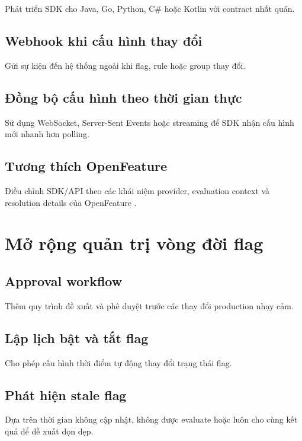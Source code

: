 Phát triển SDK cho Java, Go, Python, C\# hoặc Kotlin với contract nhất quán.

\subsection{Webhook khi cấu hình thay đổi}

Gửi sự kiện đến hệ thống ngoài khi flag, rule hoặc group thay đổi.

\subsection{Đồng bộ cấu hình theo thời gian thực}

Sử dụng WebSocket, Server-Sent Events hoặc streaming để SDK nhận cấu hình mới nhanh hơn polling.

\subsection{Tương thích OpenFeature}

Điều chỉnh SDK/API theo các khái niệm provider, evaluation context và resolution details của OpenFeature \cite{openfeature_evaluation_context,openfeature_flag_evaluation}.

\section{Mở rộng quản trị vòng đời flag}

\subsection{Approval workflow}

Thêm quy trình đề xuất và phê duyệt trước các thay đổi production nhạy cảm.

\subsection{Lập lịch bật và tắt flag}

Cho phép cấu hình thời điểm tự động thay đổi trạng thái flag.

\subsection{Phát hiện stale flag}

Dựa trên thời gian không cập nhật, không được evaluate hoặc luôn cho cùng kết quả để đề xuất dọn dẹp.

